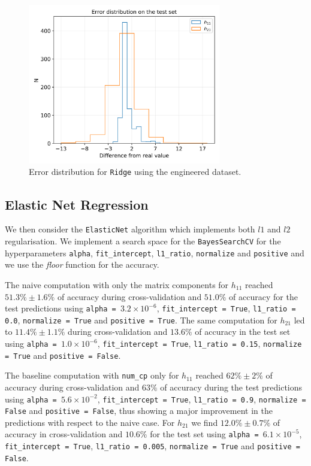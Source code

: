     \begin{figure}[t]
        \centering
        \includegraphics[width=0.75\textwidth]{tex/img/ridge_error_eng.png}
        \caption{Error distribution for \texttt{Ridge} using the engineered dataset.}
        \label{fig:ridge_err}
    \end{figure}
    
\subsection{Elastic Net Regression}
    We then consider the \texttt{ElasticNet} algorithm which implements both $l1$ and $l2$ regularisation. We implement a search space for the \texttt{BayesSearchCV} for the hyperparameters \texttt{alpha}, \texttt{fit\_intercept}, \texttt{l1\_ratio}, \texttt{normalize} and \texttt{positive} and we use the \textit{floor} function for the accuracy.
    
    The naive computation with only the matrix components for $h_{11}$ reached $51.3\% \pm 1.6\%$ of accuracy during cross-validation and $51.0\%$ of accuracy for the test predictions using \texttt{alpha = $3.2 \times 10^{-6}$}, \texttt{fit\_intercept = True}, \texttt{l1\_ratio = 0.0}, \texttt{normalize = True} and \texttt{positive = True}. The same computation for $h_{21}$ led to $11.4\% \pm 1.1\%$ during cross-validation and $13.6\%$ of accuracy in the test set using \texttt{alpha = $1.0 \times 10^{-6}$}, \texttt{fit\_intercept = True}, \texttt{l1\_ratio = 0.15}, \texttt{normalize = True} and \texttt{positive = False}.
    
    The baseline computation with \texttt{num\_cp} only for $h_{11}$ reached $62\% \pm 2\%$ of accuracy during cross-validation and $63\%$ of accuracy during the test predictions using \texttt{alpha = $5.6 \times 10^{-2}$}, \texttt{fit\_intercept = True}, \texttt{l1\_ratio = 0.9}, \texttt{normalize = False} and \texttt{positive = False}, thus showing a major improvement in the predictions with respect to the naive case. For $h_{21}$ we find $12.0\% \pm 0.7\%$ of accuracy in cross-validation and $10.6\%$ for the test set using \texttt{alpha = $6.1 \times 10^{-5}$}, \texttt{fit\_intercept = True}, \texttt{l1\_ratio = 0.005}, \texttt{normalize = True} and \texttt{positive = False}.
    
